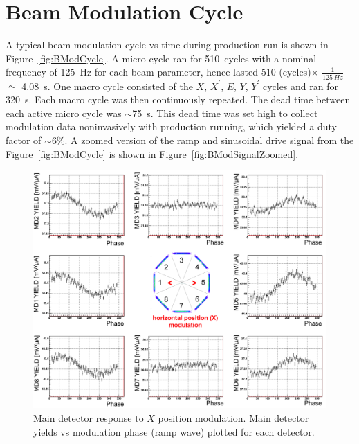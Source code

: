 \section{Beam Modulation Cycle}
\label{Beam Modulation Cycle}
A typical beam modulation cycle vs time during production run is shown in Figure~\ref{fig:BModCycle}. A micro cycle ran for 510~cycles with a nominal frequency of 125~Hz for each beam parameter, hence lasted 510 (cycles)$\times$ $\displaystyle\frac{1}{125~Hz}$ $\simeq$ 4.08~s. One macro cycle consisted of the $X$, $X^{\prime}$, $E$, $Y$, $Y^{\prime}$ cycles and ran for 320~s. Each macro cycle was then continuously repeated. 
The dead time between each active micro cycle was $\sim$75~s. This dead time was set high to collect modulation data noninvasively with production running, which yielded a duty factor of $\sim$6\%.
A zoomed version of the ramp and sinusoidal drive signal from the Figure~\ref{fig:BModCycle} is shown in Figure~\ref{fig:BModSignalZoomed}.

\begin{singlespace}
\begin{figure}[!h]
	\begin{center}
	\includegraphics[width=15.0cm]{figures/BModDetectorResponse}
	\end{center}
	\caption
	{Main detector response to $X$ position modulation. Main detector yields vs modulation phase (ramp wave) plotted for each detector. }
	\label{fig:BModDetectorResponse}
\end{figure}
\end{singlespace}

